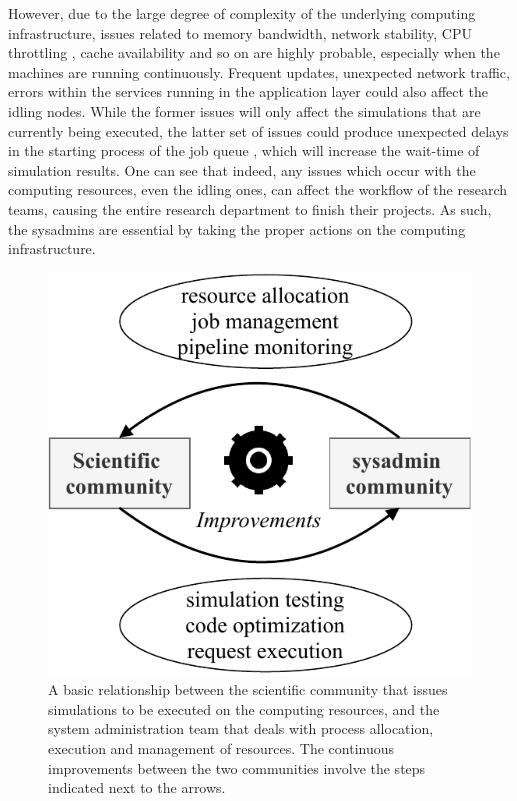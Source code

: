 \documentclass[conference]{IEEEtran}
\begin{document}
\par However, due to the large degree of complexity of the underlying computing infrastructure, issues related to memory bandwidth, network stability, CPU throttling \cite{ibm}, cache availability \cite{awscache} and so on are highly probable, especially when the machines are running continuously. Frequent updates, unexpected network traffic, errors within the services running in the application layer \cite{pstree} could also affect the idling nodes. While the former issues will only affect the simulations that are currently being executed, the latter set of issues could produce unexpected delays in the starting process of the job queue \cite{jobqeue}, which will increase the wait-time of simulation results. One can see that indeed, any issues which occur with the computing resources, even the idling ones, can affect the workflow of the research teams, causing the entire research department to finish their projects. As such, the sysadmins are essential by taking the proper actions on the computing infrastructure.

\begin{figure}[htbp]
\centerline{\includegraphics[scale=0.75]{figs/scientific_sysadmin_optimization.pdf}}
\caption{A basic relationship between the scientific community that issues simulations to be executed on the computing resources, and the system administration team that deals with process allocation, execution and management of resources. The continuous improvements between the two communities involve the steps indicated next to the arrows.}
\label{community-optimization}
\end{figure}
\end{document}
